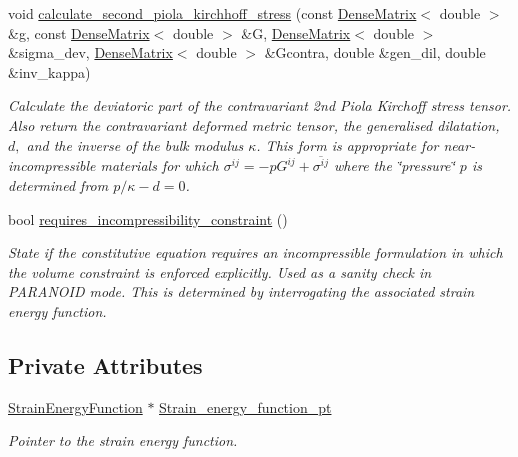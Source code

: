 \begin{DoxyCompactItemize}
void \hyperlink{classoomph_1_1IsotropicStrainEnergyFunctionConstitutiveLaw_aa45d82d322fda480f88e78cddd557837}{calculate\+\_\+second\+\_\+piola\+\_\+kirchhoff\+\_\+stress} (const \hyperlink{classoomph_1_1DenseMatrix}{Dense\+Matrix}$<$ double $>$ \&g, const \hyperlink{classoomph_1_1DenseMatrix}{Dense\+Matrix}$<$ double $>$ \&G, \hyperlink{classoomph_1_1DenseMatrix}{Dense\+Matrix}$<$ double $>$ \&sigma\+\_\+dev, \hyperlink{classoomph_1_1DenseMatrix}{Dense\+Matrix}$<$ double $>$ \&Gcontra, double \&gen\+\_\+dil, double \&inv\+\_\+kappa)
\begin{DoxyCompactList}\small\item\em Calculate the deviatoric part of the contravariant 2nd Piola Kirchoff stress tensor. Also return the contravariant deformed metric tensor, the generalised dilatation, $ d, $ and the inverse of the bulk modulus $ \kappa$. This form is appropriate for near-\/incompressible materials for which $ \sigma^{ij} = -p G^{ij} + \overline{ \sigma^{ij}} $ where the \char`\"{}pressure\char`\"{} $ p $ is determined from $ p / \kappa - d =0 $. \end{DoxyCompactList}\item 
bool \hyperlink{classoomph_1_1IsotropicStrainEnergyFunctionConstitutiveLaw_a6b9a454988b023a42782f78e4e3eebc4}{requires\+\_\+incompressibility\+\_\+constraint} ()
\begin{DoxyCompactList}\small\item\em State if the constitutive equation requires an incompressible formulation in which the volume constraint is enforced explicitly. Used as a sanity check in P\+A\+R\+A\+N\+O\+ID mode. This is determined by interrogating the associated strain energy function. \end{DoxyCompactList}\end{DoxyCompactItemize}
\subsection*{Private Attributes}
\begin{DoxyCompactItemize}
\item 
\hyperlink{classoomph_1_1StrainEnergyFunction}{Strain\+Energy\+Function} $\ast$ \hyperlink{classoomph_1_1IsotropicStrainEnergyFunctionConstitutiveLaw_a273d7ba7083654b4adfbe172d9839267}{Strain\+\_\+energy\+\_\+function\+\_\+pt}
\begin{DoxyCompactList}\small\item\em Pointer to the strain energy function. \end{DoxyCompactList}\end{DoxyCompactItemize}

